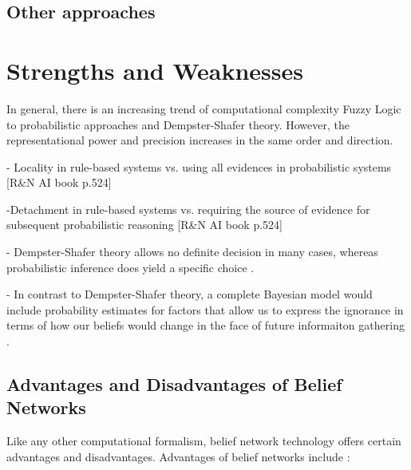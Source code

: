 \documentclass[11pt]{article}
\begin{document}
\subsection{Other approaches}

\section{Strengths and Weaknesses}

In general, there is an increasing trend of computational complexity Fuzzy Logic
to probabilistic approaches and Dempster-Shafer theory. However, the
representational power and precision increases in the same order and direction.

- Locality in rule-based systems vs. using all evidences in probabilistic
systems [R\&N AI book p.524]

-Detachment in rule-based systems vs. requiring the source of evidence for
subsequent probabilistic reasoning [R\&N AI book p.524]

- Dempster-Shafer theory allows no definite decision in many cases, whereas
probabilistic inference does yield a specific choice \cite{russell:ai-modern}.

- In contrast to Dempster-Shafer theory, a complete Bayesian model would include
probability estimates for factors that allow us to express the ignorance in
terms of how our beliefs would change in the face of future informaiton
gathering \cite{russell:ai-modern}.

\subsection{Advantages and Disadvantages of Belief Networks}

Like any other computational formalism, belief network technology offers certain
advantages and disadvantages. Advantages of belief networks include
\cite{das:decision-making-agents}:
\end{document}
